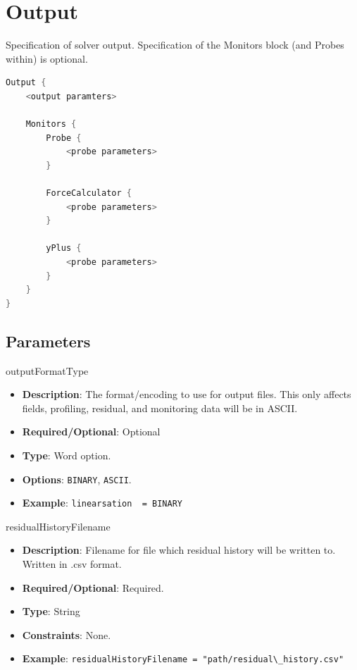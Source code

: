\section{Output}
Specification of solver output. Specification of the Monitors block (and Probes within) is optional.

\begin{lstlisting}[language=C++]
Output {
    <output paramters>
    
    Monitors {
        Probe {
            <probe parameters>
        }

        ForceCalculator {
            <probe parameters>
        }

        yPlus {
            <probe parameters>
        }
    }
}
\end{lstlisting}

\subsection*{Parameters}

outputFormatType
\vspace{\the\parameterListSpacing}
\begin{itemize}
    \item {\bf Description}: The format/encoding to use for output files. This only affects fields, profiling, residual, and monitoring data will be in ASCII.
    \item {\bf Required/Optional}: Optional
    \item {\bf Type}: Word option.
    \item {\bf Options}: \lstinline!BINARY!, \lstinline!ASCII!. 
    \item {\bf Example}: \lstinline!linearsation  = BINARY!
\end{itemize}

residualHistoryFilename
\vspace{\the\parameterListSpacing}
\begin{itemize}
    \item {\bf Description}: Filename for file which residual history will be written to. Written in .csv format.
    \item {\bf Required/Optional}: Required.
    \item {\bf Type}: String
    \item {\bf Constraints}: None.
    \item {\bf Example}: \lstinline!residualHistoryFilename = "path/residual\_history.csv"!
\end{itemize}

